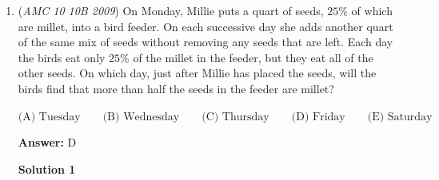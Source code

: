 \begin{enumerate}
 We have $2009 = 23 \times 87 + 8$. Thus at some point in time we will get the situation when $A=(2001,0)$ and $\overline{AB}$ is the bottom side. Obviously, at this moment $B=(2004,0)$. 

 After that, the polygon rotates around $B$ until point $C$ hits the $x$ axis at $(2008,0)$.

 And finally, the polygon rotates around $C$ until point $D$ hits the $x$ axis at $(2014,0)$.At this point the side $\boxed{\overline{CD}}$ touches the point $(2009,0)$. So the answer is $\boxed{C}$




\textbf{Solution 2: Mod Arithmetic}

The perimeter is $23$ and $2009\equiv8($mod $23)$, so it will end up on side $AB$ + a total of 8 more units. $4<8$, but $4+6=10>8$, so it ends on side $CD$ for an answer of  $\boxed{C}$.

 



\textbf{Solution 3 (similar to [1])}

The acquired distance per a revolution among the centre of the pentagon considers 23 units from position $A$. Thus, because $2009 \equiv 8 \pmod{23}$ and $\operatorname{quo}(2009,23) = 87$, it follows that $87 \cdot 23 = 2001$ slots are covered continuously before $A$ is positioned on the lefthand vertex once more, particularly, at $(2001,0)$. Thus, $B(2004,0)$ so in a rotation $C(2008,0)$ and thus $\boxed{CD}$ has the point $(2009,0)$.

 


	\item (\textit{AMC 10 10B 2009}) On Monday, Millie puts a quart of seeds, $25\%$ of which are millet, into a bird feeder.  On each successive day she adds another quart of the same mix of seeds without removing any seeds that are left.  Each day the birds eat only $25\%$ of the millet in the feeder, but they eat all of the other seeds.  On which day, just after Millie has placed the seeds, will the birds find that more than half the seeds in the feeder are millet?


 $\text{(A) } \text{Tuesday} \qquad \text{(B) } \text{Wednesday} \qquad \text{(C) } \text{Thursday} \qquad \text{(D) } \text{Friday} \qquad \text{(E) } \text{Saturday}$

 \textbf{Answer: }D



\textbf{Solution 1}


\end{enumerate}
